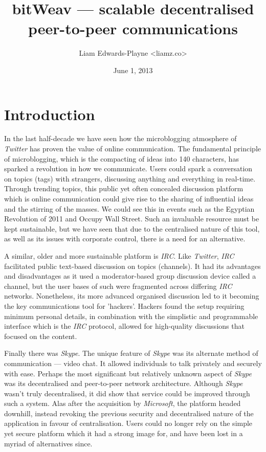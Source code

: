 \documentclass[10pt,a4paper,onecolumn]{article}
\author{Liam Edwards-Playne \textless liamz.co\textgreater}
\date{June 1, 2013}
\title{bitWeav — scalable decentralised peer-to-peer communications}
\begin{document}
\maketitle
\begin{abstract}
\end{abstract}

\section{Introduction}
\label{intro}
In the last half-decade we have seen how the microblogging atmosphere of \textit{Twitter} has proven the value of online communication. The fundamental principle of microblogging, which is the compacting of ideas into 140 characters, has sparked a revolution in how we communicate. Users could spark a conversation on topics (tags) with strangers, discussing anything and everything in real-time. Through trending topics, this public yet often concealed discussion platform which is online communication could give rise to the sharing of influential ideas and the stirring of the masses. We could see this in events such as the Egyptian Revolution of 2011 and Occupy Wall Street. Such an invaluable resource must be kept sustainable, but we have seen that due to the centralised nature of this tool, as well as its issues with corporate control, there is a need for an alternative. 

A similar, older and more sustainable platform is \textit{IRC}. Like \textit{Twitter}, \textit{IRC} facilitated public text-based discussion on topics (channels). It had its advantages and disadvantages as it used a moderator-based group discussion device called a channel, but the user bases of such were fragmented across differing \textit{IRC} networks. Nonetheless, its more advanced organised discussion led to it becoming the key communications tool for 'hackers'. Hackers found the setup requiring minimum personal details, in combination with the simplistic and programmable interface which is the \textit{IRC} protocol, allowed for high-quality discussions that focused on the content. 

Finally there was \textit{Skype}. The unique feature of \textit{Skype} was its alternate method of communication — video chat. It allowed individuals to talk privately and securely with ease. Perhaps the most significant but relatively unknown aspect of \textit{Skype} was its decentralised and peer-to-peer network architecture. Although \textit{Skype} wasn't truly decentralised, it did show that service could be improved through such a system. Alas after the acquisition by \textit{Microsoft}, the platform headed downhill, instead revoking the previous security and decentralised nature of the application in favour of centralisation. Users could no longer rely on the simple yet secure platform which it had a strong image for, and have been lost in a myriad of alternatives since. 
\end{document}

